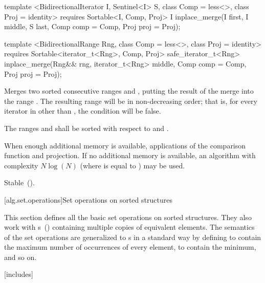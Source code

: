%
\begin{itemdecl}
template <BidirectionalIterator I, Sentinel<I> S, class Comp = less<>,
    class Proj = identity>
  requires Sortable<I, Comp, Proj>
  I
    inplace_merge(I first, I middle, S last, Comp comp = Comp{}, Proj proj = Proj{});

template <BidirectionalRange Rng, class Comp = less<>, class Proj = identity>
  requires Sortable<iterator_t<Rng>, Comp, Proj>
  safe_iterator_t<Rng>
    inplace_merge(Rng&& rng, iterator_t<Rng> middle, Comp comp = Comp{},
                  Proj proj = Proj{});
\end{itemdecl}

\begin{itemdescr}
\pnum
\effects
Merges two sorted consecutive ranges
and
,
putting the result of the merge into the range
.
The resulting range will be in non-decreasing order;
that is, for every iterator
in
other than
,
the condition
will be false.

\pnum
\requires
The ranges  and  shall be
sorted with respect to  and .

\pnum
\returns {}

\pnum
\complexity
When enough additional memory is available,
applications of the comparison function and projection.
If no additional memory is available, an algorithm with complexity
$N \log(N)$
(where
is equal to
)
may be used.

\pnum
\remarks Stable~().
\end{itemdescr}

[alg.set.operations]{Set operations on sorted structures}

\pnum
This section defines all the basic set operations on sorted structures.
They also work with
s~()
containing multiple copies of equivalent elements.
The semantics of the set operations are generalized to
s
in a standard way by defining
to contain the maximum number of occurrences of every element,
to contain the minimum, and so on.

[includes]{}

